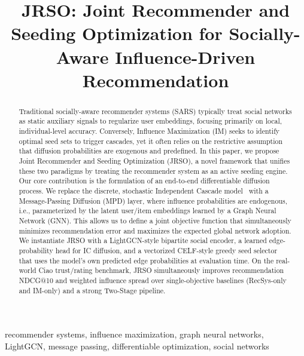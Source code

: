 \documentclass[conference]{IEEEtran}
\begin{document}
\title{JRSO: Joint Recommender and Seeding Optimization for Socially-Aware
Influence-Driven Recommendation}

\author{
\and
{}
}

\maketitle

\begin{abstract}
Traditional socially-aware recommender systems (SARS) typically treat
social networks as static auxiliary signals to regularize user
embeddings, focusing primarily on local, individual-level accuracy.
Conversely, Influence Maximization (IM) seeks to identify optimal seed
sets to trigger cascades, yet it often relies on the restrictive
assumption that diffusion probabilities are exogenous and predefined. In
this paper, we propose Joint Recommender and Seeding Optimization
(JRSO), a novel framework that unifies these two paradigms by treating
the recommender system as an active seeding engine. Our core
contribution is the formulation of an end-to-end differentiable
diffusion process. We replace the discrete, stochastic Independent
Cascade model~\cite{wang2012scalable,shakarian2015independent} with a
Message-Passing Diffusion (MPD) layer, where influence probabilities are
endogenous, i.e., parameterized by the latent user/item embeddings
learned by a Graph Neural Network (GNN). This allows us to define a
joint objective function that simultaneously minimizes recommendation
error and maximizes the expected global network adoption. We instantiate
JRSO with a LightGCN-style bipartite social encoder, a learned
edge-probability head for IC diffusion, and a vectorized CELF-style
greedy seed selector that uses the model's own predicted edge
probabilities at evaluation time. On the real-world Ciao trust/rating
benchmark, JRSO simultaneously improves recommendation NDCG@10 and
weighted influence spread over single-objective baselines (RecSys-only
and IM-only) and a strong Two-Stage pipeline.
\end{abstract}

\begin{IEEEkeywords}
recommender systems, influence maximization, graph neural networks,
LightGCN, message passing, differentiable optimization, social networks
\end{IEEEkeywords}
\end{document}

